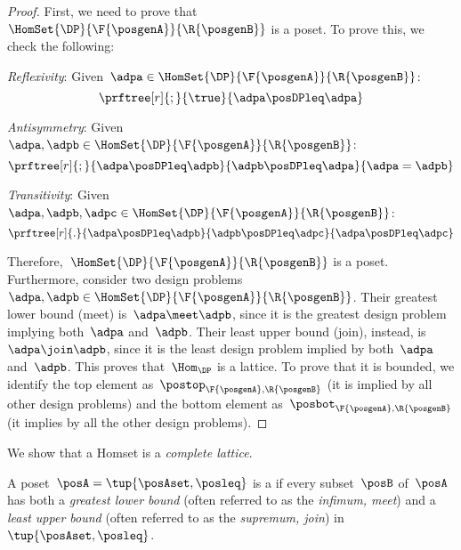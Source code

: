 \begin{proof}
    First, we need to prove that~$\HomSet{\DP}{\F{\posgenA}}{\R{\posgenB}}$ is a poset.
    To prove this, we check the following:
    \begin{compactitem}
        \item \emph{Reflexivity}: Given~$\adpa\in \HomSet{\DP}{\F{\posgenA}}{\R{\posgenB}}$:
        \begin{equation*}
            \prftree[r]{;}{\true}{\adpa\posDPleq \adpa}
        \end{equation*}
        \item \emph{Antisymmetry}: Given~$\adpa,\adpb\in \HomSet{\DP}{\F{\posgenA}}{\R{\posgenB}}$:
        \begin{equation*}
            \prftree[r]{;}{\adpa\posDPleq \adpb}{\adpb\posDPleq \adpa}{\adpa=\adpb}
        \end{equation*}
        \item \emph{Transitivity}: Given~$\adpa,\adpb,\adpc\in \HomSet{\DP}{\F{\posgenA}}{\R{\posgenB}}$:
        \begin{equation*}
            \prftree[r]{.}{\adpa\posDPleq \adpb}{\adpb\posDPleq \adpc}{\adpa \posDPleq \adpc}
        \end{equation*}
    \end{compactitem}
    Therefore,~$\HomSet{\DP}{\F{\posgenA}}{\R{\posgenB}}$ is a poset.
    Furthermore, consider two design problems~$\adpa,\adpb\in \HomSet{\DP}{\F{\posgenA}}{\R{\posgenB}}$.
    Their greatest lower bound (meet) is~$\adpa\meet\adpb$, since it is the greatest design problem implying both~$\adpa$ and~$\adpb$.
    Their least upper bound (join), instead, is~$\adpa\join \adpb$, since it is the least design problem implied by both~$\adpa$ and~$\adpb$.
    This proves that~$\Hom_\DP$ is a lattice.
    To prove that it is bounded, we identify the top element as~$\postop_{\F{\posgenA},\R{\posgenB}}$ (it is implied by all other design problems) and the bottom element as~$\posbot_{\F{\posgenA},\R{\posgenB}}$ (it implies by all the other design problems).
\end{proof}

We show that a \DP Homset is a \emph{complete lattice}.

\begin{definition}
    \label{def:complete-lattice}
    A poset~$\posA=\tup{\posAset,\posleq}$ is a \emph{} if every subset~$\posB$ of~$\posA$ has both a \emph{greatest lower bound} (often referred to as the \emph{infimum, meet}) and a \emph{least upper bound} (often referred to as the \emph{supremum, join}) in~$\tup{\posAset, \posleq}$.
\end{definition}

